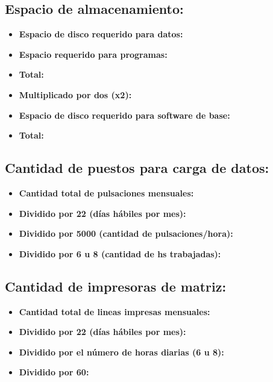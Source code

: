 \subsection{Espacio de almacenamiento:}
\begin{itemize}
  \item \textbf{Espacio de disco requerido para datos:}
  \item \textbf{Espacio requerido para programas:}
  \item \textbf{Total:}
  \item \textbf{Multiplicado por dos (x2):}
  \item \textbf{Espacio de disco requerido para software de base:}
  \item \textbf{Total:}
\end{itemize}

\subsection{Cantidad de puestos para carga de datos:}
\begin{itemize}
  \item \textbf{Cantidad total de pulsaciones mensuales:}
  \item \textbf{Dividido por 22 (días hábiles por mes):}
  \item \textbf{Dividido por 5000 (cantidad de pulsaciones/hora):}
  \item \textbf{Dividido por 6 u 8 (cantidad de hs trabajadas):}
\end{itemize}

\subsection{Cantidad de impresoras de matriz:}
\begin{itemize}
  \item \textbf{Cantidad total de lineas impresas mensuales:}
  \item \textbf{Dividido por 22 (días hábiles por mes):}
  \item \textbf{Dividido por el número de horas diarias (6 u 8):}
  \item \textbf{Dividido por 60:}
\end{itemize}

